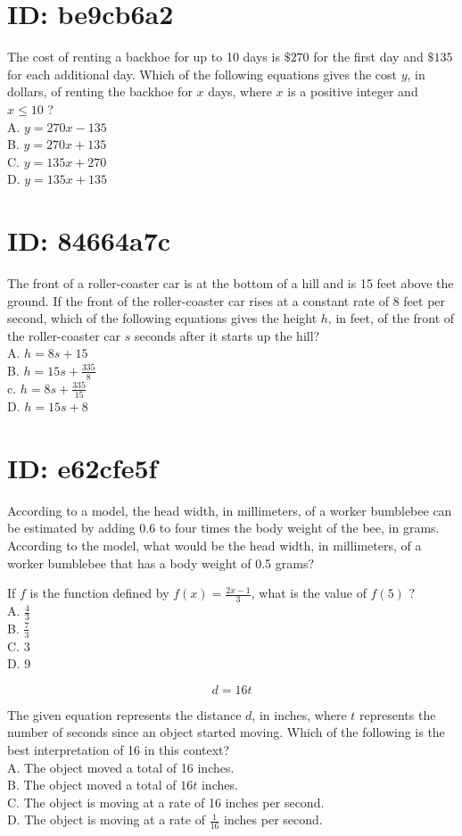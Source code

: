 \section*{ID: be9cb6a2}
The cost of renting a backhoe for up to 10 days is $\$ 270$ for the first day and $\$ 135$ for each additional day. Which of the following equations gives the cost $y$, in dollars, of renting the backhoe for $x$ days, where $x$ is a positive integer and $x \leq 10$ ?\\
A. $y=270 x-135$\\
B. $y=270 x+135$\\
C. $y=135 x+270$\\
D. $y=135 x+135$

\section*{ID: 84664a7c}
The front of a roller-coaster car is at the bottom of a hill and is 15 feet above the ground. If the front of the roller-coaster car rises at a constant rate of 8 feet per second, which of the following equations gives the height $h$, in feet, of the front of the roller-coaster car $s$ seconds after it starts up the hill?\\
A. $h=8 s+15$\\
B. $h=15 s+\frac{335}{8}$\\
c. $h=8 s+\frac{335}{15}$\\
D. $h=15 s+8$

\section*{ID: e62cfe5f}
According to a model, the head width, in millimeters, of a worker bumblebee can be estimated by adding 0.6 to four times the body weight of the bee, in grams. According to the model, what would be the head width, in millimeters, of a worker bumblebee that has a body weight of 0.5 grams?

If $f$ is the function defined by $f(x)=\frac{2 x-1}{3}$, what is the value of $f(5)$ ?\\
A. $\frac{4}{3}$\\
B. $\frac{7}{3}$\\
C. 3\\
D. 9

$$
d=16 t
$$

The given equation represents the distance $d$, in inches, where $t$ represents the number of seconds since an object started moving. Which of the following is the best interpretation of 16 in this context?\\
A. The object moved a total of 16 inches.\\
B. The object moved a total of $16 t$ inches.\\
C. The object is moving at a rate of 16 inches per second.\\
D. The object is moving at a rate of $\frac{1}{16}$ inches per second.

